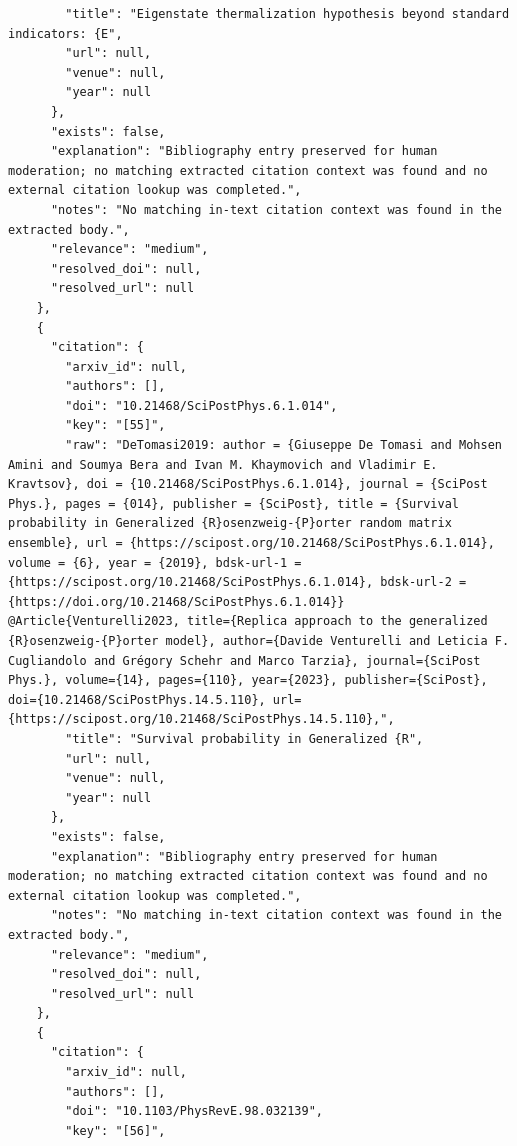 \documentclass[11pt]{article}
\begin{document}
\begin{verbatim}
        "title": "Eigenstate thermalization hypothesis beyond standard indicators: {E",
        "url": null,
        "venue": null,
        "year": null
      },
      "exists": false,
      "explanation": "Bibliography entry preserved for human moderation; no matching extracted citation context was found and no external citation lookup was completed.",
      "notes": "No matching in-text citation context was found in the extracted body.",
      "relevance": "medium",
      "resolved_doi": null,
      "resolved_url": null
    },
    {
      "citation": {
        "arxiv_id": null,
        "authors": [],
        "doi": "10.21468/SciPostPhys.6.1.014",
        "key": "[55]",
        "raw": "DeTomasi2019: author = {Giuseppe De Tomasi and Mohsen Amini and Soumya Bera and Ivan M. Khaymovich and Vladimir E. Kravtsov}, doi = {10.21468/SciPostPhys.6.1.014}, journal = {SciPost Phys.}, pages = {014}, publisher = {SciPost}, title = {Survival probability in Generalized {R}osenzweig-{P}orter random matrix ensemble}, url = {https://scipost.org/10.21468/SciPostPhys.6.1.014}, volume = {6}, year = {2019}, bdsk-url-1 = {https://scipost.org/10.21468/SciPostPhys.6.1.014}, bdsk-url-2 = {https://doi.org/10.21468/SciPostPhys.6.1.014}} @Article{Venturelli2023, title={Replica approach to the generalized {R}osenzweig-{P}orter model}, author={Davide Venturelli and Leticia F. Cugliandolo and Grégory Schehr and Marco Tarzia}, journal={SciPost Phys.}, volume={14}, pages={110}, year={2023}, publisher={SciPost}, doi={10.21468/SciPostPhys.14.5.110}, url={https://scipost.org/10.21468/SciPostPhys.14.5.110},",
        "title": "Survival probability in Generalized {R",
        "url": null,
        "venue": null,
        "year": null
      },
      "exists": false,
      "explanation": "Bibliography entry preserved for human moderation; no matching extracted citation context was found and no external citation lookup was completed.",
      "notes": "No matching in-text citation context was found in the extracted body.",
      "relevance": "medium",
      "resolved_doi": null,
      "resolved_url": null
    },
    {
      "citation": {
        "arxiv_id": null,
        "authors": [],
        "doi": "10.1103/PhysRevE.98.032139",
        "key": "[56]",

\end{verbatim}
\end{document}
